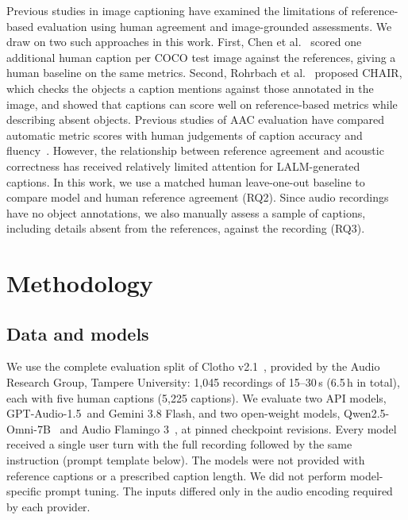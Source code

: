 \documentclass{article}
\newcommand{\gpt}{GPT-Audio-1.5}
\newcommand{\gem}{Gemini 3.8 Flash}
\newcommand{\qwen}{Qwen2.5-Omni-7B}
\newcommand{\af}{Audio Flamingo 3}
\begin{document}
Previous studies in image captioning have examined the limitations of reference-based evaluation using human
agreement and image-grounded assessments. We draw on two such approaches in this work. First, Chen et
al.~\cite{chen2015coco} scored one additional human caption per COCO test image against the references, giving a human
baseline on the same metrics. Second, Rohrbach et al.~\cite{rohrbach2018chair} proposed CHAIR, which checks the objects a caption
mentions against those annotated in the image, and showed that captions can score well on reference-based metrics
while describing absent objects. Previous studies of AAC evaluation have compared automatic metric scores with human judgements of caption
accuracy and fluency~\cite{zhou2022fense,dixit2025mace}. However, the relationship between reference agreement and
acoustic correctness has received relatively limited attention for LALM-generated captions. In this work, we use a
matched human leave-one-out baseline to compare model and human reference agreement (RQ2). Since audio recordings
have no object annotations, we also manually assess a sample of captions, including details absent from the
references, against the recording (RQ3).

\section{Methodology}
\label{sec:method}

\subsection{Data and models}
\label{ssec:data}

We use the complete evaluation split of Clotho v2.1~\cite{drossos2020clotho}, provided by the Audio Research Group, Tampere University: 1,045 recordings of 15--30\,s (6.5\,h in
total), each with five human captions (5,225 captions). We evaluate two API models, \gpt\ and \gem, and two open-weight models, \qwen~\cite{xu2025qwen25omni} and
\af~\cite{ghosh2025af3}, at pinned checkpoint revisions. Every model received a single user turn with the full
recording followed by the same instruction (prompt template below). The models were not provided with reference
captions or a prescribed caption length. We did not perform model-specific prompt tuning. The inputs differed only in
the audio encoding required by each provider.
\end{document}
